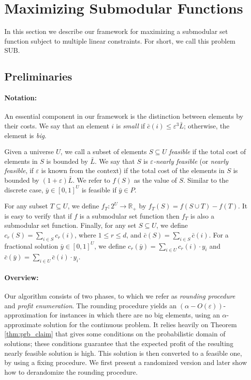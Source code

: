 \documentclass[11pt]{article}
\newcommand{\eps}{\varepsilon}
\newcommand{\by}{\bar{y}}
\newcommand{\bL}{\bar{L}}
\newcommand{\bc}{\bar{c}}
\newcommand{\SUB}{\mbox{SUB}}
\begin{document}
{\section{Maximizing Submodular Functions}


\label{sec:randomized_mcmb}

In this section we describe our framework for maximizing a
submodular set function subject to multiple linear constraints.
For short, we call this problem $\SUB$.

\subsection{Preliminaries}
\label{sec:prel}

\paragraph{Notation:}
An essential component in our framework is the distinction between
elements by their costs. We say that an element $i$
is \emph{small} if $\bc (i) \leq \eps^3 \bL$; otherwise,
the element is \emph{big}.




Given a universe $U$, we call a subset of elements $S\subseteq U$
{\em feasible} if the total cost of elements in $S$ is bounded by
$\bL$. We say that  $S$ is \emph{$\eps$-nearly feasible} (or
\emph{nearly feasible}, if $\eps$ is known from the context) if the total
cost of the elements in $S$ is bounded by $(1+\eps) \bL$. We refer
to $f(S)$ as the value of $S$. Similar to the discrete case,
$\bar{y}\in [0,1]^U$ is feasible if $\bar{y} \in P$.

For any subset $T \subseteq U$, we define $f_T: 2^{U} \rightarrow
\mathbb{R}_{+}$ by $f_T(S) = f(S \cup T) - f(T)$. It is easy to
verify that if $f$ is a submodular set function then $f_T$ is also
a submodular set function. Finally, for any set $S \subseteq U$,
we define $c_r(S)=\sum_{i \in S} c_r(i)$, where $1 \leq r \leq d$, and
 $\bc(S)= \sum_{i \in S} \bc(i)$.  For a fractional solution $\by \in [0,1]^U$, we
define $c_r(\bar{y}) = \sum_{i\in U} c_r(i) \cdot y_i$ and
$\bc(\bar{y})= \sum_{i\in U} \bc(i)\cdot y_i$.


\paragraph{Overview:}
Our algorithm consists of two phases, to which we refer as
{\em rounding procedure} and {\em profit enumeration}. The rounding procedure
yields an $(\alpha-O(\eps))$-approximation for
instances in which there are no big elements, using an
$\alpha$-approximate solution for the continuous problem. It relies heavily
on Theorem \ref{thm:prb_claim} that gives some conditions on the
probabilistic domain of solutions; these conditions guarantee that the
expected profit of the resulting nearly feasible solution is high. This
solution is then converted to a feasible one, by using a
fixing procedure. We first present a randomized version
and later show
how to derandomize the rounding procedure.


}
\end{document}
